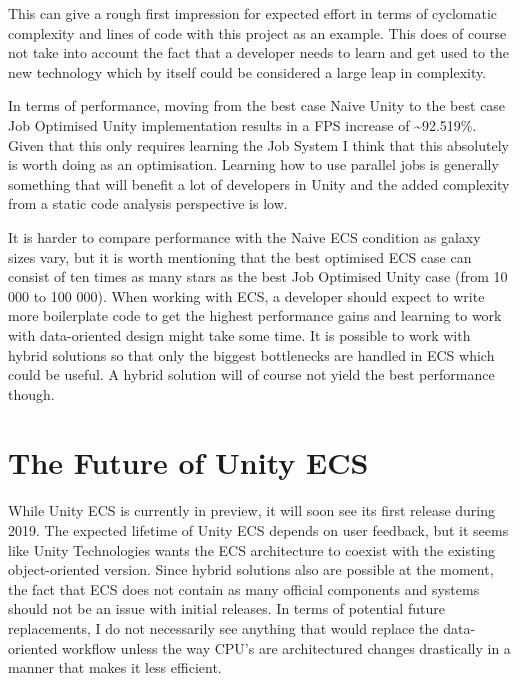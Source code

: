 This can give a rough first impression for expected effort in terms of cyclomatic complexity and lines of code with this project as an example. This does of course not take into account the fact that a developer needs to learn and get used to the new technology which by itself could be considered a large leap in complexity. 

In terms of performance, moving from the best case Naive Unity to the best case Job Optimised Unity implementation results in a FPS increase of \textasciitilde92.519\%. Given that this only requires learning the Job System I think that this absolutely is worth doing as an optimisation. Learning how to use parallel jobs is generally something that will benefit a lot of developers in Unity and the added complexity from a static code analysis perspective is low. 

It is harder to compare performance with the Naive ECS condition as galaxy sizes vary, but it is worth mentioning that the best optimised ECS case can consist of ten times as many stars as the best Job Optimised Unity case (from 10 000 to 100 000). When working with ECS, a developer should expect to write more boilerplate code to get the highest performance gains and learning to work with data-oriented design might take some time. It is possible to work with hybrid solutions so that only the biggest bottlenecks are handled in ECS which could be useful. A hybrid solution will of course not yield the best performance though.

\section{The Future of Unity ECS}
While Unity ECS is currently in preview, it will soon see its first release during 2019. The expected lifetime of Unity ECS depends on user feedback, but it seems like Unity Technologies wants the ECS architecture to coexist with the existing object-oriented version. Since hybrid solutions also are possible at the moment, the fact that ECS does not contain as many official components and systems should not be an issue with initial releases. In terms of potential future replacements, I do not necessarily see anything that would replace the data-oriented workflow unless the way CPU's are architectured changes drastically in a manner that makes it less efficient.